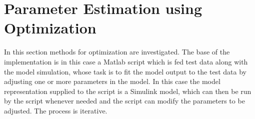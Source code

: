 \section{Parameter Estimation using Optimization}\label{sec:parameterEstimationUsingOptimization}
In this section methods for optimization are investigated. The base of the implementation is in this case a Matlab script which is fed test data along with the model simulation, whose task is to fit the model output to the test data by adjusting one or more parameters in the model. In this case the model representation supplied to the script is a Simulink model, which can then be run by the script whenever needed and the script can modify the parameters to be adjusted. The process is iterative.